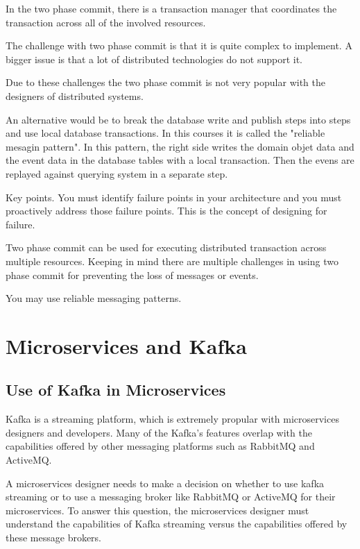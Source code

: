 \documentclass[a4paper, 11pt]{book}
\begin{document}
    In the two phase commit, there is a transaction manager that coordinates the transaction across all of the involved resources.

    The challenge with two phase commit is that it is quite complex to implement.
    A bigger issue is that a lot of distributed technologies do not support it.

    Due to these challenges the two phase commit is not very popular with the designers of distributed systems.


    An alternative would be to break the database write and publish steps into steps and use local database transactions.
    In this courses it is called the "reliable mesagin pattern". In this pattern, the right side writes the domain objet data and the event data in the database tables with a local transaction.
    Then the evens are replayed against querying system in a separate step.

    Key points.
    You must identify failure points in your architecture and you must proactively address those failure points.
    This is the concept of designing for failure.

    Two phase commit can be used for executing distributed transaction across multiple resources.
    Keeping in mind there are multiple challenges in using two phase commit for preventing the loss of messages or events.

    You may use reliable messaging patterns.



    \chapter{Microservices and Kafka}


    \section{Use of Kafka in Microservices}

    Kafka is a streaming platform, which is extremely propular with microservices designers and developers.
    Many of the Kafka's features overlap with the capabilities offered by other messaging platforms such as RabbitMQ and ActiveMQ.

    A microservices designer needs to make a decision on whether to use kafka streaming or to use a messaging broker like RabbitMQ or ActiveMQ for their microservices.
    To answer this question, the microservices designer must understand the capabilities of Kafka streaming versus the capabilities offered by these message brokers.
\end{document}

